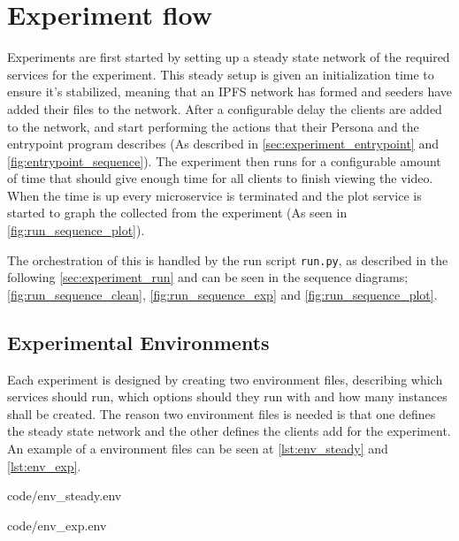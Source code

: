\section{Experiment flow}
\label{sec:impl-flow}
Experiments are first started by setting up a steady state network of the required services for the experiment. This steady setup is given an initialization time to ensure it's stabilized, meaning that an \ac{IPFS} network has formed and seeders have added their files to the network.
After a configurable delay the clients are added to the network, and start performing the actions that their Persona and the entrypoint program describes (As described in \autoref{sec:experiment_entrypoint} and \autoref{fig:entrypoint_sequence}).
The experiment then runs for a configurable amount of time that should give enough time for all clients to finish viewing the video. When the time is up every microservice is terminated and the plot service is started to graph the collected from the experiment (As seen in \autoref{fig:run_sequence_plot}).

The orchestration of this is handled by the run script \texttt{run.py}, as described in the following \autoref{sec:experiment_run} and can be seen in the sequence diagrams; \autoref{fig:run_sequence_clean}, \ref{fig:run_sequence_exp} and \ref{fig:run_sequence_plot}.

\subsection{Experimental Environments}
\label{sec:experiment_env}
Each experiment is designed by creating two environment files, describing which services should run, which options should they run with and how many instances shall be created. The reason two environment files is needed is that one defines the steady state network and the other defines the clients add for the experiment. An example of a environment files can be seen at \autoref{lst:env_steady} and \ref{lst:env_exp}.

\noindent\begin{minipage}[t]{.40\textwidth}

                {code/env_steady.env}
\end{minipage}
\hfill
\begin{minipage}[t]{.51\textwidth}

                {code/env_exp.env}
\end{minipage}\bigskip

